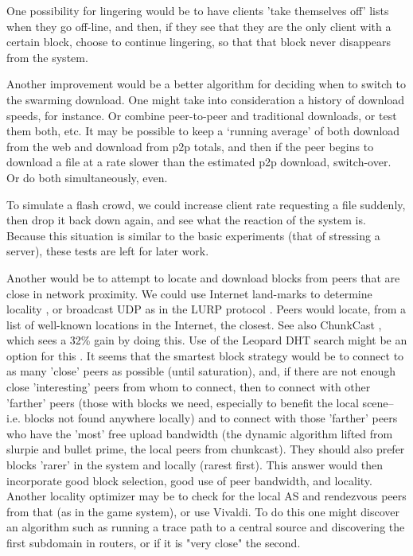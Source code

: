 One possibility for lingering would be to have clients 'take themselves off' lists when they go off-line, and then, if they see that they are the only client with a certain block, choose to continue lingering, so that that block never disappears from the system.

Another improvement would be a better algorithm for deciding when to switch to the swarming download.  One might take into consideration a history of download speeds, for instance.  Or combine peer-to-peer and traditional downloads, or test them both, etc.  It may be possible to keep a `running average' of both download from the web and download from p2p totals, and then if the peer begins to download a file at a rate slower than the estimated p2p download, switch-over.  Or do both simultaneously, even.

To simulate a flash crowd, we could increase client rate requesting a file suddenly, then drop it back down again, and see what the reaction of the system is. Because this situation is similar to the basic experiments (that of stressing a server), these tests are left for later work.

Another would be to attempt to locate and download blocks from peers that are close in network proximity.  We could use Internet land-marks to determine locality \cite{landmarks}, or broadcast UDP as in the LURP protocol \cite{lurp}.  Peers would locate, from a list of well-known locations in the Internet, the closest.  See also ChunkCast \cite{chunkcast}, which sees a 32\% gain by doing this.  Use of the Leopard DHT search might be an option for this \cite{leopard}.  It seems that the smartest block strategy would be to connect to as many 'close' peers as possible (until saturation), and, if there are not enough close 'interesting' peers from whom to connect, then to connect with other 'farther' peers (those with blocks we need, especially to benefit the local scene--i.e. blocks not found anywhere locally) and to connect with those 'farther' peers who have the 'most' free upload bandwidth (the dynamic algorithm lifted from slurpie and bullet prime, the local peers from chunkcast).  They should also prefer blocks 'rarer' in the system and locally (rarest first).  This answer would then incorporate good block selection, good use of peer bandwidth, and locality.  Another locality optimizer may be to check for the local AS and rendezvous peers from that (as in the game system), or use Vivaldi.  To do this one might discover an algorithm such as running a trace path to a central source and discovering the first subdomain in routers, or if it is "very close" the second.

